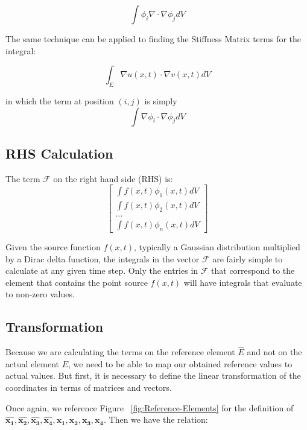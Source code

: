 \begin{equation}
\label{eq:Stiff-Eq-PML}
\int \phi_i \nabla \cdot \nabla \phi_j dV
\end{equation}

The same technique can be applied to finding the Stiffness Matrix terms for the integral:

\begin{equation}
\int_E \nabla u(x,t) \cdot \nabla v(x,t) dV
\end{equation}

in which the term at position $(i,j)$ is simply
\begin{equation}
\label{eq:Stiff-Eq-ABC}
\int \nabla \phi_i \cdot \nabla \phi_j dV
\end{equation}

\subsection{RHS Calculation}

The term $\mathcal{F}$ on the right hand side (RHS) is:
\begin{equation}
\begin{bmatrix}
\int f(x,t) \phi_1(x,t) dV \\
\int f(x,t) \phi_2(x,t) dV \\
\ldots \\
\int f(x,t) \phi_n(x,t) dV
\end{bmatrix}
\end{equation}

Given the source function $f(x,t)$, typically a Gaussian distribution multiplied by a Dirac delta function, the integrals in the vector $\mathcal{F}$ are fairly simple to calculate at any given time step. Only the entries in $\mathcal{F}$ that correspond to the element that contains the point source $f(x,t)$ will have integrals that evaluate to non-zero values.

\subsection{Transformation}
\label{subsec: Transformation}

Because we are calculating the terms on the reference element $\hat{E}$ and not on the actual element $E$, we need to be able to map our obtained reference values to actual values. But first, it is necessary to define the linear transformation of the coordinates in terms of matrices and vectors. 

Once again, we reference Figure ~\ref{fig:Reference-Elements} for the definition of $\boldsymbol{\hat{x_1}}, \boldsymbol{\hat{x_2}}, \boldsymbol{\hat{x_3}}, \boldsymbol{\hat{x_4}}, \boldsymbol{x_1}, \boldsymbol{x_2}, \boldsymbol{x_3}, \boldsymbol{x_4}$. Then we have the relation:

